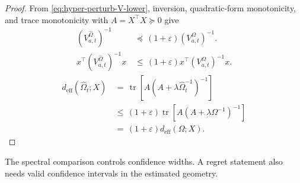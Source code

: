 \documentclass{article} %
\begin{document}
\begin{proof}
From \eqref{eq:hyper-perturb-V-lower}, inversion, quadratic-form monotonicity,
and trace monotonicity with \(A=X^\top X\succeq0\) give
\begin{equation}
\label{eq:hyper-perturb-width-proof-qf}
\begin{aligned}
\left(V_{a,t}^{\widehat{\Omega}}\right)^{-1}
&\,\preceq\,
(1+\varepsilon)
\left(V_{a,t}^{\Omega}\right)^{-1}.
\\
x^\top
\left(V_{a,t}^{\widehat{\Omega}}\right)^{-1}
x
&\,\leq\,
(1+\varepsilon)
x^\top
\left(V_{a,t}^{\Omega}\right)^{-1}
x .
\end{aligned}
\end{equation}
\begin{equation}
\label{eq:hyper-perturb-deff-proof}
\begin{aligned}
d_{\mathrm{eff}}(\widehat{\Omega}_t;X)
&\,=\,
\operatorname{tr}
\!\left[
A
\left(
A+\lambda\widehat{\Omega}_t^{-1}
\right)^{-1}
\right]
\\
&\,\leq\,
(1+\varepsilon)
\operatorname{tr}
\!\left[
A
\left(
A+\lambda\Omega^{-1}
\right)^{-1}
\right]
\\
&\,=\,
(1+\varepsilon)
d_{\mathrm{eff}}(\Omega;X).
\end{aligned}
\end{equation}
\end{proof}

The spectral comparison controls confidence widths. A regret statement also
needs valid confidence intervals in the estimated geometry.
\end{document}
